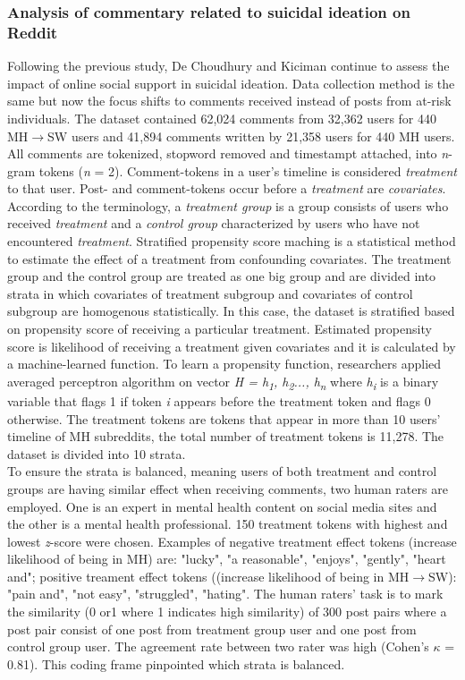 \subsubsection*{Analysis of commentary related to suicidal ideation on Reddit}
Following the previous study, De Choudhury and Kiciman \cite{DeChoudhury2017} continue to assess the impact of online social support in suicidal ideation. Data collection method is the same but now the focus shifts to comments received instead of posts from at-risk individuals. The dataset contained 62,024 comments from 32,362 users for 440 MH$\rightarrow$SW users and 41,894 comments written by 21,358 users for 440 MH users. All comments are tokenized, stopword removed and timestampt attached, into \textit{n}-gram tokens (\textit{n} = 2). Comment-tokens in a user's timeline is considered \textit{treatment} to that user. Post- and comment-tokens occur before a \textit{treatment} are \textit{covariates}. According to the terminology, a \textit{treatment group} is a group consists of users who received \textit{treatment} and a \textit{control group} characterized by users who have not encountered \textit{treatment}. Stratified propensity score maching is a statistical method to estimate the effect of a treatment from confounding covariates. The treatment group and the control group are treated as one big group and are divided into strata in which covariates of treatment subgroup and covariates of control subgroup are homogenous statistically. In this case, the dataset is stratified based on propensity score of receiving a particular treatment. Estimated propensity score is likelihood of receiving a treatment given covariates and it is calculated by a machine-learned function. To learn a propensity function, researchers applied averaged perceptron algorithm on vector \textit{H = h\textsubscript{1}, h\textsubscript{2}..., h\textsubscript{n}} where \textit{h\textsubscript{i}} is a binary variable that flags 1 if token \textit{i} appears before the treatment token and flags 0 otherwise. The treatment tokens are tokens that appear in more than 10 users' timeline of MH subreddits, the total number of treatment tokens is 11,278. The dataset is divided into 10 strata.\\
To ensure the strata is balanced, meaning users of both treatment and control groups are having similar effect when receiving comments, two human raters are employed. One is an expert in mental health content on social media sites and the other is a mental health professional. 150 treatment tokens with highest and lowest \textit{z}-score were chosen. Examples of negative treatment effect tokens (increase likelihood of being in MH) are: "lucky", "a reasonable", "enjoys", "gently", "heart and"; positive treament effect tokens ((increase likelihood of being in MH$\rightarrow$SW): "pain and", "not easy", "struggled", "hating". The human raters' task is to mark the similarity (0 or1 where 1 indicates high similarity) of 300 post pairs where a post pair consist of one post from treatment group user and one post from control group user. The agreement rate between two rater was high (Cohen's $\kappa$ = 0.81). This coding frame pinpointed which strata is balanced.\\
